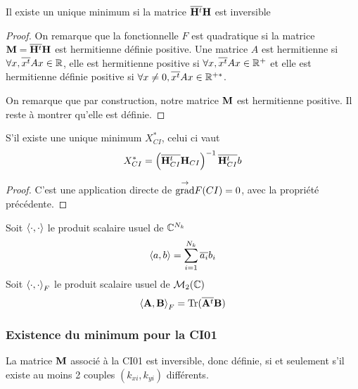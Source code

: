     \begin{prop}
      Il existe un unique minimum si la matrice \({\overline{\mathbf{H}^t}}{\mathbf{H}}\) est inversible
    \end{prop}

    \begin{proof}
      On remarque que la fonctionnelle \(F\) est quadratique si la matrice \(\mathbf{M}={\overline{\mathbf{H}^t}}{\mathbf{H}}\) est hermitienne définie positive. Une matrice \(A\) est hermitienne si \(\forall x, {\overline{x^t}}Ax \in \mathbb R\), elle est hermitienne positive si \(\forall x, {\overline{x^t}}Ax \in \mathbb R^+\) et elle est hermitienne définie positive si \(\forall x\not=0, {\overline{x^t}}Ax \in \mathbb R^{+*}\).

      On remarque que par construction, notre matrice \(\mathbf{M}\) est hermitienne positive. Il reste à montrer qu'elle est définie.
    \end{proof}

    \begin{prop}
      S'il existe une unique minimum \(X_{CI}^*\), celui ci vaut
      \[
        X_{CI}^* = \left({\overline{\mathbf{H}_{CI}^t}}{\mathbf{H}_{CI}}\right)^{-1}{\overline{\mathbf{H}_{CI}^t}}b
      \]
    \end{prop}

    \begin{proof}
      C'est une application directe de \({{\overset{\rightarrow}{\operatorname{grad}}}}{} F(CI) = 0 \), avec la propriété précédente.
    \end{proof}

    \begin{defn}
      Soit \(\left<{\cdot},{\cdot}\right>\) le produit scalaire usuel de \(\mathbb C^{N_{k}}\)
      \begin{equation*}
        \left<{a},{b}\right> = \sum_{i=1}^{N_k} {\overline{a_i}} b_i
      \end{equation*}
      Soit \(\left<{\cdot},{\cdot}\right>_F\) le produit scalaire usuel de \(\mathcal{M}_2(\mathbb C)\)
      \begin{equation*}
        \left<{\mathbf{A}},{\mathbf{B}}\right>_F = \operatorname{Tr}({\overline{\mathbf{A}^t}}\mathbf{B})
      \end{equation*}
    \end{defn}

    \subsubsection{Existence du minimum pour la CI01}

      \begin{prop}
        La matrice \({\mathbf{M}}\) associé à la CI01 est inversible, donc définie, si et seulement s'il existe au moins 2 couples \((k_{xi},k_{yi})\) différents.
      \end{prop}

